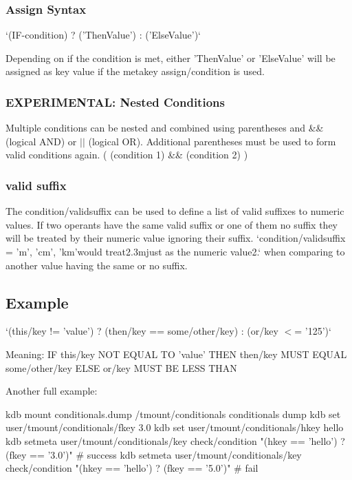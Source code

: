 \subsubsection*{Assign Syntax}

`(I\+F-\/condition) ? ('Then\+Value') \+: ('Else\+Value')`

Depending on if the condition is met, either 'Then\+Value' or 'Else\+Value' will be assigned as key value if the metakey {\ttfamily assign/condition} is used.

\subsubsection*{E\+X\+P\+E\+R\+I\+M\+E\+N\+T\+A\+L\+: Nested Conditions}

Multiple conditions can be nested and combined using parentheses and {\ttfamily \&\&} (logical A\+N\+D) or {\ttfamily $\vert$$\vert$} (logical O\+R). Additional parentheses must be used to form valid conditions again. {\ttfamily (} {\ttfamily (condition 1) \&\& (condition 2)} {\ttfamily )}

\subsubsection*{valid suffix}

The {\ttfamily condition/validsuffix} can be used to define a list of valid suffixes to numeric values. If two operants have the same valid suffix or one of them no suffix they will be treated by their numeric value ignoring their suffix. `condition/validsuffix = 'm', 'cm', 'km'{\ttfamily would treat}2.\+3m{\ttfamily just as the numeric value}2.` when comparing to another value having the same or no suffix.

\subsection*{Example}

`(this/key != 'value') ? (then/key == some/other/key) \+: (or/key $<$= '125')`

Meaning\+: I\+F {\ttfamily this/key} N\+O\+T E\+Q\+U\+A\+L T\+O {\ttfamily 'value'} T\+H\+E\+N {\ttfamily then/key} M\+U\+S\+T E\+Q\+U\+A\+L {\ttfamily some/other/key} E\+L\+S\+E {\ttfamily or/key} M\+U\+S\+T B\+E L\+E\+S\+S T\+H\+A\+N {}

Another full example\+: \begin{DoxyVerb}    kdb mount conditionals.dump /tmount/conditionals conditionals dump
    kdb set user/tmount/conditionals/fkey 3.0
    kdb set user/tmount/conditionals/hkey hello
    kdb setmeta user/tmount/conditionals/key check/condition "(hkey == 'hello') ? (fkey == '3.0')" # success
    kdb setmeta user/tmount/conditionals/key check/condition "(hkey == 'hello') ? (fkey == '5.0')" # fail
\end{DoxyVerb}


